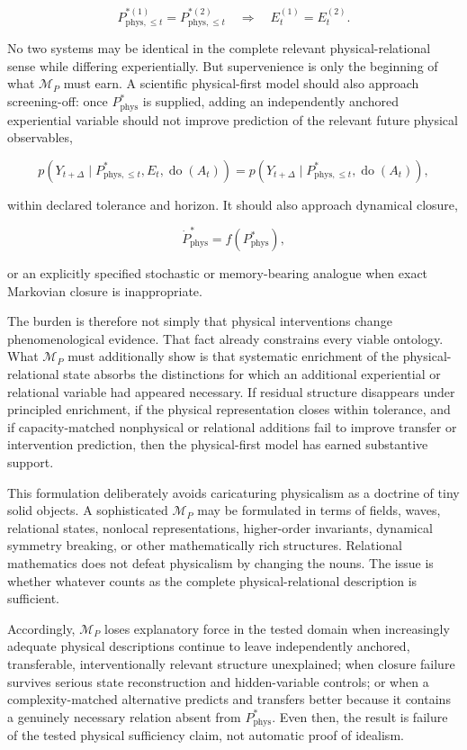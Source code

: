 \[
P_{\mathrm{phys},\le t}^{\ast(1)}
=
P_{\mathrm{phys},\le t}^{\ast(2)}
\quad\Longrightarrow\quad
E_t^{(1)}=E_t^{(2)}.
\]

No two systems may be identical in the complete relevant physical-relational sense while differing experientially. But supervenience is only the beginning of what $\mathcal M_P$ must earn. A scientific physical-first model should also approach screening-off: once $P_{\mathrm{phys}}^{\ast}$ is supplied, adding an independently anchored experiential variable should not improve prediction of the relevant future physical observables,

\[
p(Y_{t+\Delta}\mid P_{\mathrm{phys},\le t}^{\ast},E_t,\operatorname{do}(A_t))
=
p(Y_{t+\Delta}\mid P_{\mathrm{phys},\le t}^{\ast},\operatorname{do}(A_t)),
\]

within declared tolerance and horizon. It should also approach dynamical closure,

\[
\dot P_{\mathrm{phys}}^{\ast}=f(P_{\mathrm{phys}}^{\ast}),
\]

or an explicitly specified stochastic or memory-bearing analogue when exact Markovian closure is inappropriate.

The burden is therefore not simply that physical interventions change phenomenological evidence. That fact already constrains every viable ontology. What $\mathcal M_P$ must additionally show is that systematic enrichment of the physical-relational state absorbs the distinctions for which an additional experiential or relational variable had appeared necessary. If residual structure disappears under principled enrichment, if the physical representation closes within tolerance, and if capacity-matched nonphysical or relational additions fail to improve transfer or intervention prediction, then the physical-first model has earned substantive support.

This formulation deliberately avoids caricaturing physicalism as a doctrine of tiny solid objects. A sophisticated $\mathcal M_P$ may be formulated in terms of fields, waves, relational states, nonlocal representations, higher-order invariants, dynamical symmetry breaking, or other mathematically rich structures. Relational mathematics does not defeat physicalism by changing the nouns. The issue is whether whatever counts as the complete physical-relational description is sufficient.

Accordingly, $\mathcal M_P$ loses explanatory force in the tested domain when increasingly adequate physical descriptions continue to leave independently anchored, transferable, interventionally relevant structure unexplained; when closure failure survives serious state reconstruction and hidden-variable controls; or when a complexity-matched alternative predicts and transfers better because it contains a genuinely necessary relation absent from $P_{\mathrm{phys}}^{\ast}$. Even then, the result is failure of the tested physical sufficiency claim, not automatic proof of idealism.

